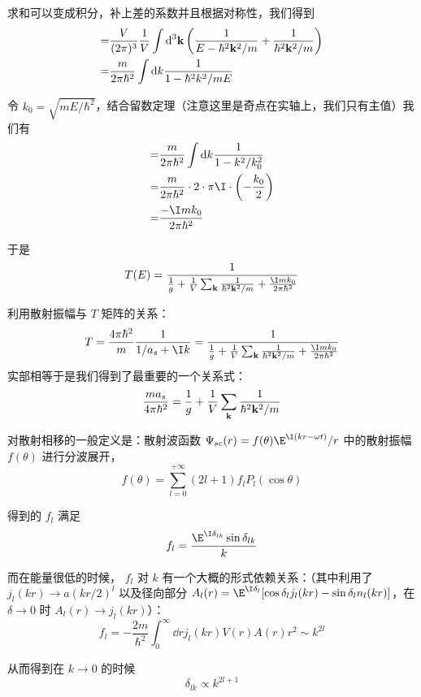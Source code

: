 求和可以变成积分，补上差的系数并且根据对称性，我们得到
\begin{equation}
\begin{split}
=&\frac{V}{(2\pi)^3}\frac{1}{V}\int\text{d}^3{\bf k}\left(\frac{1}{E-\hbar^2{\bf k}^2/m} + \frac{1}{\hbar^2{\bf k}^2/m}\right)\\
=&\frac{m}{2\pi\hbar^2}\int\text{d}k\frac{1}{1-\hbar^2k^2/mE} 
\end{split}
\end{equation}

令 $k_0 = \sqrt{mE/\hbar^2}$，结合留数定理（注意这里是奇点在实轴上，我们只有主值）我们有
\begin{equation}
\begin{split}
=&\frac{m}{2\pi\hbar^2}\int\text{d}k\frac{1}{1-k^2/k_0^2} \\
=&\frac{m}{2\pi\hbar^2}\cdot 2\cdot \pi \I \cdot \left(-\frac{k_0}{2}\right)\\
=&\frac{-\I mk_0}{2\pi\hbar^2}
\end{split}
\end{equation}

于是
\begin{equation}
T(E) = \dfrac{1}{\frac{1}{g} + \frac{1}{V}\sum_{\bf k}\frac{1}{\hbar^2{\bf k}^2/m} + \frac{\I mk_0}{2\pi\hbar^2}}
\end{equation}

利用散射振幅与 $T$ 矩阵的关系：
\begin{equation}
T=\frac{4\pi\hbar^2}{m}\frac{1}{1/a_s + \I k} = \dfrac{1}{\frac{1}{g} + \frac{1}{V}\sum_{\bf k}\frac{1}{\hbar^2{\bf k}^2/m} + \frac{\I mk_0}{2\pi\hbar^2}}
\end{equation}
实部相等于是我们得到了最重要的一个关系式：
\begin{equation}\label{renorm}
\frac{ma_s}{4\pi\hbar^2} = \frac{1}{g} + \frac{1}{V}\sum_{\bf k}\frac{1}{\hbar^2{\bf k}^2/m}
\end{equation}

对散射相移的一般定义是：散射波函数 $\Psi_{sc}(r) = f(\theta) \E^{\I (kr-\omega t)}/r$ 中的散射振幅 $f(\theta)$ 进行分波展开，
\begin{equation}
f(\theta) = \sum_{l=0}^{+\infty} (2l+1) f_l P_l(\cos\theta)
\end{equation}

得到的 $f_l$ 满足
\begin{equation}
f_l = \frac{\E^{\I\delta_{lk}}\sin\delta_{lk}}{k}
\end{equation}

而在能量很低的时候， $f_l$ 对 $k$ 有一个大概的形式依赖关系：（其中利用了 $j_l(kr)\to a(kr/2)^l$ 以及径向部分 $A_l(r) = \E^{\I\delta_l}[\cos\delta_l j_l(kr) -  \sin\delta_l n_l(kr)]$，在 $\delta\to0$ 时 $A_l(r)\to j_l(kr)$）：
\begin{equation}
f_l = -\frac{2m}{\hbar^2}\int_0^{\infty} \dd{r} j_l(kr)V(r)A(r)r^2 \sim k^{2l}
\end{equation}

从而得到在 $k\to0$ 的时候
\begin{equation}
\delta_{lk}\propto k^{2l+1}
\end{equation}

